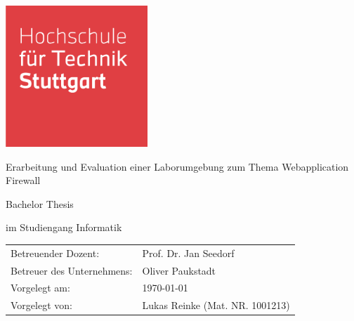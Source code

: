\begin{titlepage}
    \includegraphics[width=0.4\textwidth]{images/HFT_logo}
    \centering
    \vspace{1.5cm}
    {\par \LARGE Erarbeitung und Evaluation einer Laborumgebung zum Thema Webapplication Firewall\par}
    \vspace{1cm}
    {\par \large Bachelor Thesis\par}
    {\par \large im Studiengang Informatik\par}
    \vfill
    \begin{table}[!hbt]
        \centering
        \begin{tabular}{ll}
            Betreuender Dozent:         & Prof. Dr. Jan Seedorf           \\
            Betreuer des Unternehmens:  & Oliver Paukstadt                \\
            Vorgelegt am:               & \today                          \\
            Vorgelegt von:              & Lukas Reinke (Mat. NR. 1001213)
        \end{tabular}\label{tab:info}
    \end{table}
\end{titlepage}